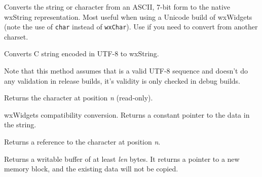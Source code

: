 



Converts the string or character from an ASCII, 7-bit form
to the native wxString representation. Most useful when using
a Unicode build of wxWidgets (note the use of {\tt char} instead of {\tt wxChar}).
Use  if you
need to convert from another charset.


\label{wxstringfromutf8}



Converts C string encoded in UTF-8 to wxString.

Note that this method assumes that  is a valid UTF-8 sequence and
doesn't do any validation in release builds, it's validity is only checked in
debug builds.


\label{wxstringgetchar}


Returns the character at position {\it n} (read-only).


\label{wxstringgetdata}


wxWidgets compatibility conversion. Returns a constant pointer to the data in the string.


\label{wxstringgetwritablechar}


Returns a reference to the character at position {\it n}.


\label{wxstringgetwritebuf}


Returns a writable buffer of at least {\it len} bytes.
It returns a pointer to a new memory block, and the
existing data will not be copied.

